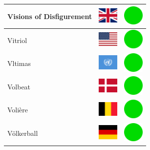\documentclass[12pt, a4paper, twoside]{report}
\begin{document}
\begin{center}
\begin{longtable}{|p{5cm}|p{2cm}|p{2cm}|}
 Visions of Disfigurement                                   & \includegraphics[width=1cm]{../4x3/gb} &   \includegraphics[width=1cm]{../likes/y} \\ \hline
 Vitriol                                                    & \includegraphics[width=1cm]{../4x3/us} &   \includegraphics[width=1cm]{../likes/y} \\ \hline
 Vltimas                                                    & \includegraphics[width=1cm]{../4x3/un} &   \includegraphics[width=1cm]{../likes/y} \\ \hline
 Volbeat                                                    & \includegraphics[width=1cm]{../4x3/dk} &   \includegraphics[width=1cm]{../likes/y} \\ \hline
 Volière                                                    & \includegraphics[width=1cm]{../4x3/be} &   \includegraphics[width=1cm]{../likes/y} \\ \hline
 Völkerball                                                 & \includegraphics[width=1cm]{../4x3/de} &   \includegraphics[width=1cm]{../likes/y} \\ \hline

\end{longtable}
\end{center}
\end{document}

